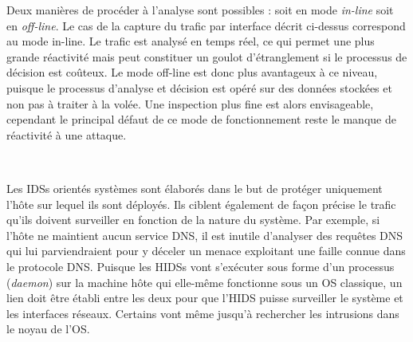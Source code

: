 \documentclass[]{article}
\newcommand{\minit}[1]{\noindent{\small\textbf{ \underline{#1}}}\vspace{0.2cm}}
\begin{document}
\par Deux manières de procéder à l'analyse sont possibles : soit en mode \textit{in-line} soit en \textit{off-line}. Le cas de la capture du trafic par interface décrit ci-dessus correspond au mode in-line. Le trafic est analysé en temps réel, ce qui permet une plus grande réactivité mais peut constituer un goulot d'étranglement si le processus de décision est coûteux. Le mode off-line est donc plus avantageux à ce niveau, puisque le processus d'analyse et décision est opéré sur des données stockées et non pas à traiter à la volée. Une inspection plus fine est alors envisageable, cependant le principal défaut de ce mode de fonctionnement reste le manque de réactivité à une attaque.

~\\
\newpage
\minit{Les HIDSs}

\par Les IDSs orientés systèmes sont élaborés dans le but de protéger uniquement l'hôte sur lequel ils sont déployés. Ils ciblent également de façon précise le trafic qu'ils doivent surveiller en fonction de la nature du système. Par exemple, si l'hôte ne maintient aucun service DNS, il est inutile d'analyser des requêtes DNS qui lui parviendraient pour y déceler un menace exploitant une faille connue dans le protocole DNS. Puisque les HIDSs vont s'exécuter sous forme d'un processus (\textit{daemon}) sur la machine hôte qui elle-même fonctionne sous un OS classique, un lien doit être établi entre les deux pour que l'HIDS puisse surveiller le système et les interfaces réseaux. Certains vont même jusqu'à rechercher les intrusions dans le noyau de l'OS.\\
\end{document}
